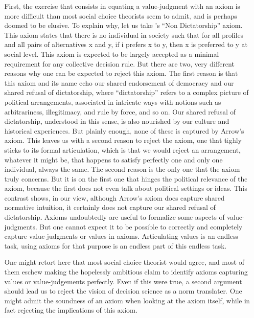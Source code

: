 \documentclass[preprint,11pt]{elsarticle}
\begin{document}
First, the exercise that consists in equating a value-judgment with an axiom is more difficult than most social choice theorists seem to admit, and is perhaps doomed to be elusive. To explain why, let us take \cite{arrow_social_2012}'s “Non Dictatorship” axiom. This axiom states that there is no individual  in society such that for all profiles and all pairs of alternatives x and y, if i prefers x to y, then x is preferred to y at social level. This axiom is expected to be largely accepted as a minimal requirement for any collective decision rule. But there are two, very different reasons why one can be expected to reject this axiom. The first reason is that this axiom and its name echo our shared endorsement of democracy and our shared refusal of dictatorship, where ``dictatorship'' refers to a complex picture of political arrangements, associated in intricate ways with notions such as arbitrariness, illegitimacy, and rule by force, and so on. Our shared refusal of dictatorship, understood in this sense, is also nourished by our culture and historical experiences. But plainly enough, none of these is captured by Arrow's axiom. This leaves us with a second reason to reject the axiom, one that tighly sticks to its formal articulation, which is that we would reject an arrangement, whatever it might be, that happens to satisfy perfectly one and only one individual, always the same. The second reason is the only one that the axiom truly concerns. But it is on the first one that hinges the political relevance of the axiom, because the first does not even talk about political settings or ideas. This contrast shows, in our view, although Arrow's axiom does capture shared normative intuition, it certainly does not capture our shared refusal of dictatorship. Axioms undoubtedly are useful to formalize some aspects of value-judgments. But one cannot expect it to be possible to correctly and completely capture value-judgments or values in axioms. Articulating values is an endless task, using axioms for that purpose is an endless part of this endless task.

One might retort here that most social choice theorist would agree, and most of them eschew making the hopelessly ambitious claim to identify axioms capturing values or value-judgements perfectly. Even if this were true, a second argument should lead us to reject the vision of decision science as a norm translater. One might admit the soundness of an axiom when looking at the axiom itself, while in fact rejecting the implications of this axiom.
\end{document}
